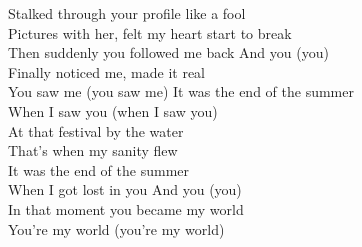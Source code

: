 \begin{lyrics}
Stalked through your profile like a fool\\
Pictures with her, felt my heart start to break\\
Then suddenly you followed me back
And you (you)\\
Finally noticed me, made it real\\
You saw me (you saw me)
It was the end of the summer\\
When I saw you (when I saw you)\\
At that festival by the water\\
That’s when my sanity flew\\
It was the end of the summer\\
When I got lost in you
And you (you)\\
In that moment you became my world\\
You’re my world (you’re my world)
\end{lyrics}

